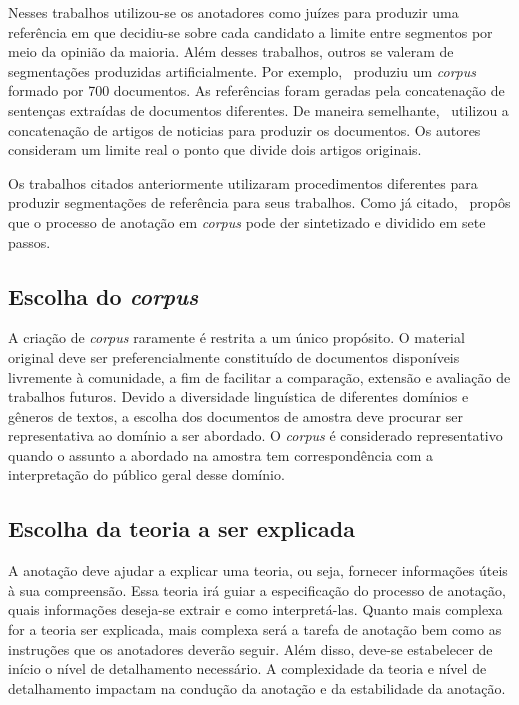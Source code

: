 Nesses trabalhos utilizou-se os anotadores como juízes para produzir uma referência em que decidiu-se sobre cada candidato a limite entre segmentos por meio da opinião da maioria. Além desses trabalhos, outros se valeram de segmentações produzidas artificialmente. Por exemplo,~\cite{Choic99} produziu um \textit{corpus} formado por 700 documentos. As referências foram geradas pela concatenação de sentenças extraídas de documentos diferentes. De maneira semelhante,~\cite{CHAIBI2014} utilizou a concatenação de artigos de noticias para produzir os documentos. Os autores consideram um limite real o ponto que divide dois artigos originais. 



Os trabalhos citados anteriormente utilizaram procedimentos diferentes para produzir segmentações de referência para seus trabalhos. Como já citado,~\cite{Hovy2010} propôs que o processo de anotação em \textit{corpus} pode der sintetizado e dividido em sete passos. 


\subsection*{Escolha do \textit{corpus}}
A criação de \textit{corpus} raramente é restrita a um único propósito. O material original deve ser preferencialmente constituído de documentos disponíveis livremente à comunidade, a fim de facilitar a comparação, extensão e avaliação de trabalhos futuros. 
Devido a diversidade linguística de diferentes domínios e gêneros de textos, a escolha dos documentos de amostra deve procurar ser representativa ao domínio a ser abordado. O \textit{corpus} é considerado representativo quando o assunto a abordado na amostra tem correspondência com a interpretação do público geral desse domínio.

\subsection*{Escolha da teoria a ser explicada}
A anotação deve ajudar a explicar uma teoria, ou seja, fornecer informações úteis à sua compreensão. Essa teoria irá guiar a especificação do processo de anotação, quais informações deseja-se extrair e como interpretá-las. Quanto mais complexa for a teoria ser explicada, mais complexa será a tarefa de anotação bem como as instruções que os anotadores deverão seguir. Além disso, deve-se estabelecer de início o nível de detalhamento necessário. 
A complexidade da teoria e nível de detalhamento impactam na condução da anotação e da estabilidade da anotação.

